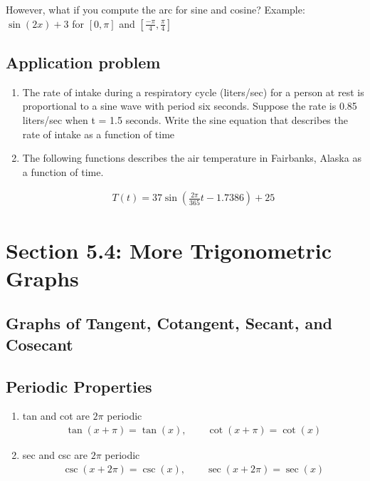 \documentclass{tufte-handout}
\begin{document}
However, what if you compute the arc for sine and cosine?  Example: $\sin(2x)+3$ for $[0,\pi]$ and $[\frac{-\pi}{4},\frac{\pi}{4}]$

\subsection{Application problem}
\begin{enumerate}
\item The rate of intake during a respiratory cycle (liters/sec) for a person at rest is proportional to a sine wave with period six seconds. Suppose the rate is 0.85 liters/sec when t = 1.5 seconds. Write the sine equation that describes the rate of intake as a function of time

\item The following functions describes the air temperature in Fairbanks, Alaska as a function of time.

\begin{gather}
T(t) = 37 \sin(\frac{2\pi}{365}t - 1.7386) + 25
\end{gather}

\end{enumerate}


\section{Section 5.4: More Trigonometric Graphs}

\subsection{Graphs of Tangent, Cotangent, Secant, and Cosecant}

\subsection{Periodic Properties}
\begin{enumerate}
\item tan and cot are $2\pi$ periodic
\begin{align*}
\tan(x + \pi) = \tan(x), \qquad \cot(x + \pi) = \cot(x)
\end{align*}
\item sec and csc are $2\pi$ periodic
\begin{align*}
\csc(x + 2\pi) = \csc(x), \qquad \sec(x + 2\pi) = \sec(x)
\end{align*}
\end{enumerate}
\end{document}
